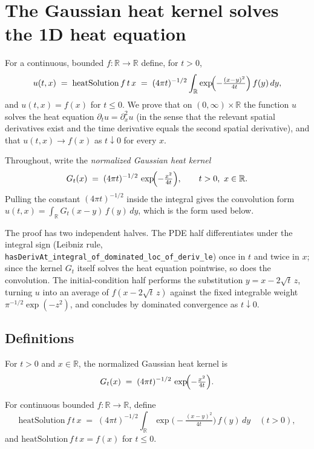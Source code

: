 


\section{The Gaussian heat kernel solves the 1D heat equation}

For a continuous, bounded $f : \mathbb{R} \to \mathbb{R}$ define, for $t > 0$,
\[
  u(t,x) \;=\; \mathrm{heatSolution}\,f\,t\,x
  \;=\; (4\pi t)^{-1/2} \int_{\mathbb{R}} \exp\!\Bigl(-\tfrac{(x-y)^2}{4t}\Bigr)\, f(y)\, dy,
\]
and $u(t,x) = f(x)$ for $t \le 0$. We prove that on $(0,\infty)\times\mathbb{R}$ the
function $u$ solves the heat equation $\partial_t u = \partial_x^2 u$ (in the sense
that the relevant spatial derivatives exist and the time derivative equals the
second spatial derivative), and that $u(t,x) \to f(x)$ as $t \downarrow 0$ for
every $x$.

Throughout, write the \emph{normalized Gaussian heat kernel}
\[
  G_t(x) \;=\; (4\pi t)^{-1/2}\,\exp\!\Bigl(-\tfrac{x^2}{4t}\Bigr), \qquad t > 0,\ x \in \mathbb{R}.
\]
Pulling the constant $(4\pi t)^{-1/2}$ inside the integral gives the convolution form
$u(t,x) = \int_{\mathbb{R}} G_t(x-y)\, f(y)\, dy$, which is the form used below.

The proof has two independent halves. The PDE half differentiates under the
integral sign (Leibniz rule, \texttt{hasDerivAt\_integral\_of\_dominated\_loc\_of\_deriv\_le})
once in $t$ and twice in $x$; since the kernel $G_t$ itself solves the heat
equation pointwise, so does the convolution. The initial-condition half performs
the substitution $y = x - 2\sqrt{t}\,z$, turning $u$ into an average of
$f(x - 2\sqrt{t}\,z)$ against the fixed integrable weight $\pi^{-1/2}\exp(-z^2)$,
and concludes by dominated convergence as $t \downarrow 0$.

\subsection{Definitions}

\begin{definition}
    \label{def:kernel}
    For $t > 0$ and $x \in \mathbb{R}$, the normalized Gaussian heat kernel is
    \[ G_t(x) \;=\; (4\pi t)^{-1/2}\,\exp\!\Bigl(-\tfrac{x^2}{4t}\Bigr). \]
\end{definition}

\begin{definition}
    \label{def:heatSolution}
    For continuous bounded $f : \mathbb{R} \to \mathbb{R}$, define
    \[ \mathrm{heatSolution}\,f\,t\,x \;=\;
       (4\pi t)^{-1/2}\int_{\mathbb{R}} \exp\!\bigl(-\tfrac{(x-y)^2}{4t}\bigr)\, f(y)\, dy
       \quad (t > 0), \]
    and $\mathrm{heatSolution}\,f\,t\,x = f(x)$ for $t \le 0$.
\end{definition}

